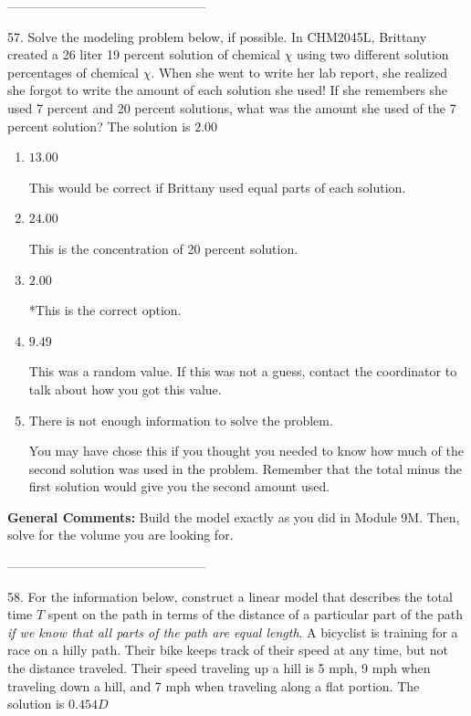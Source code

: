 \documentclass{extbook}[14pt]
\begin{document}
-----------------------------------------------

57. Solve the modeling problem below, if possible.
In CHM2045L, Brittany created a 26 liter 19 percent solution of chemical $\chi$ using two different solution percentages of chemical $\chi$. When she went to write her lab report, she realized she forgot to write the amount of each solution she used! If she remembers she used 7 percent and 20 percent solutions, what was the amount she used of the 7 percent solution? 
The solution is $ 2.00 $ 

\begin{enumerate}[label=\Alph*.] 
\item $ 13.00 $ 

 This would be correct if Brittany used equal parts of each solution. 
\item $ 24.00 $ 

 This is the concentration of 20 percent solution. 
\item $ 2.00 $ 

 *This is the correct option. 
\item $ 9.49 $ 

 This was a random value. If this was not a guess, contact the coordinator to talk about how you got this value. 
\item $ \text{There is not enough information to solve the problem.} $ 

 You may have chose this if you thought you needed to know how much of the second solution was used in the problem. Remember that the total minus the first solution would give you the second amount used. 
\end{enumerate} 
 
\textbf{General Comments:} Build the model exactly as you did in Module 9M. Then, solve for the volume you are looking for.

-----------------------------------------------

58. For the information below, construct a linear model that describes the total time $T$ spent on the path in terms of the distance of a particular part of the path \textit{if we know that all parts of the path are equal length}.
A bicyclist is training for a race on a hilly path. Their bike keeps track of their speed at any time, but not the distance traveled. Their speed traveling up a hill is 5 mph, 9 mph when traveling down a hill, and 7 mph when traveling along a flat portion. 
The solution is $ 0.454 D $ 
\end{document}
